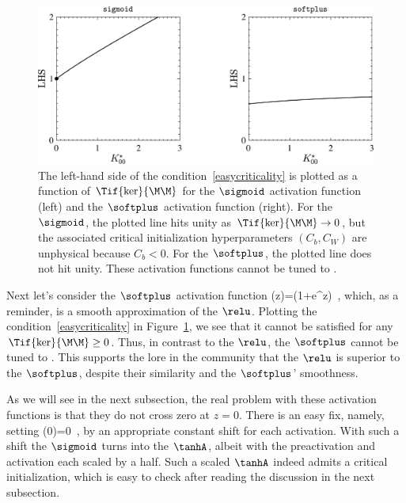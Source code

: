 \begin{figure}[h]
\begin{center}
 \includegraphics[width=0.85\linewidth]{./book_figures/criticality_sigmoid_and_softplus}
\end{center}
\caption{The left-hand side of the condition~\eqref{easycriticality} is plotted as a function of $\Tif{\ker}{\M\M}$ for the $\sigmoid$ activation function (left) and the $\softplus$ activation function (right).
For the $\sigmoid$, the plotted line hits unity as $\Tif{\ker}{\M\M}\rightarrow 0$, but the associated critical initialization hyperparameters $(C_b,C_W)$ are unphysical because $C_b<0$.
For the $\softplus$, the plotted line does not hit unity.
These activation functions cannot be tuned to .}
\label{fig:no-crit}
\end{figure}


Next let's consider the $\softplus$ activation function
\be
\sigma(z)=\log\!\le(1+e^{z}\ri)\, ,
\ee
which, as a reminder, is a smooth approximation of the $\relu$.
Plotting the condition~\eqref{easycriticality} in Figure~\ref{fig:no-crit}, we see that it cannot be satisfied for any $\Tif{\ker}{\M\M}\geq0$.
Thus, in contrast to the $\relu$, the $\softplus$ cannot be tuned to . This supports the lore in the community that the $\relu$ is superior to the $\softplus$, despite their similarity and the $\softplus$' smoothness.



As we will see in the next subsection, the real problem with these activation functions is that they do not cross zero at $z=0$. There is an easy fix, namely, setting
\be
\sigma(0)=0\, ,
\ee
by an appropriate constant shift for each activation. With such a shift the $\sigmoid$ turns into the $\tanhA$, albeit with the preactivation and activation each scaled by a half. Such a scaled $\tanhA$ indeed admits a critical initialization, which is easy to check after reading the discussion in the next subsection.


